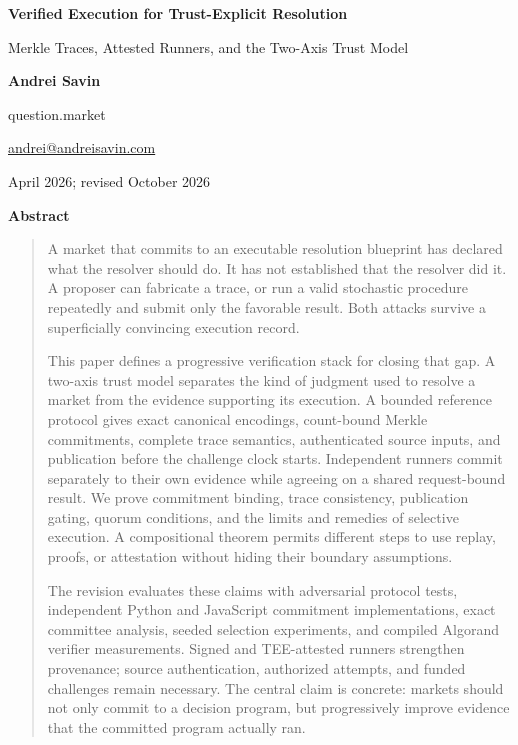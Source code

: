 \documentclass[10pt]{article}
\renewenvironment{abstract}{%
  \centerline{\bfseries\normalsize Abstract}%
  \vspace{0.5ex}%
  \begin{quote}\small
}{%
  \end{quote}%
}
\begin{document}
\begin{center}
{\LARGE\bfseries Verified Execution for Trust-Explicit Resolution\par}
\vspace{0.4em}
{\large Merkle Traces, Attested Runners, and the Two-Axis Trust Model\par}
\vspace{1.2em}
{\normalsize\bfseries Andrei Savin\par}
\vspace{0.3em}
{\small question.market\par}
{\small\href{mailto:andrei@andreisavin.com}{andrei@andreisavin.com}\par}
\vspace{0.6em}
{\small April 2026; revised October 2026\par}
\end{center}

\vspace{0.8em}

\begin{abstract}
A market that commits to an executable resolution blueprint has declared what the resolver should do. It has not established that the resolver did it. A proposer can fabricate a trace, or run a valid stochastic procedure repeatedly and submit only the favorable result. Both attacks survive a superficially convincing execution record.

This paper defines a progressive verification stack for closing that gap. A two-axis trust model separates the kind of judgment used to resolve a market from the evidence supporting its execution. A bounded reference protocol gives exact canonical encodings, count-bound Merkle commitments, complete trace semantics, authenticated source inputs, and publication before the challenge clock starts. Independent runners commit separately to their own evidence while agreeing on a shared request-bound result. We prove commitment binding, trace consistency, publication gating, quorum conditions, and the limits and remedies of selective execution. A compositional theorem permits different steps to use replay, proofs, or attestation without hiding their boundary assumptions.

The revision evaluates these claims with adversarial protocol tests, independent Python and JavaScript commitment implementations, exact committee analysis, seeded selection experiments, and compiled Algorand verifier measurements. Signed and TEE-attested runners strengthen provenance; source authentication, authorized attempts, and funded challenges remain necessary. The central claim is concrete: markets should not only commit to a decision program, but progressively improve evidence that the committed program actually ran.
\end{abstract}
\vspace{1em}
{\small\renewcommand{\contentsname}{}\setcounter{tocdepth}{2}\tableofcontents}
\vspace{0.5em}





\FloatBarrier

\appendix

\end{document}
